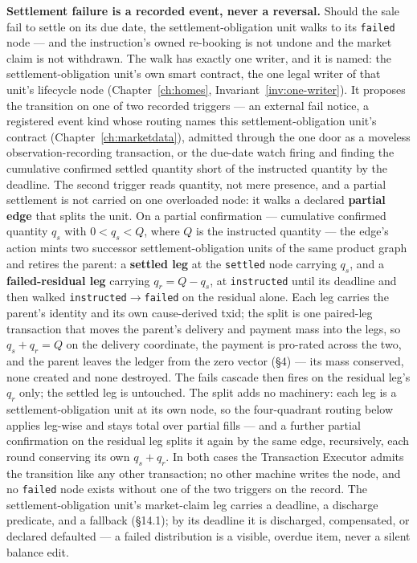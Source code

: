 \documentclass[11pt,a4paper]{article}
\begin{document}
\medskip\noindent\textbf{Settlement failure is a recorded event, never a reversal.}
Should the sale fail to settle on its due date, the settlement-obligation unit walks
to its \texttt{failed} node --- and the instruction's owned re-booking is not undone
and the market claim is not withdrawn. The walk has exactly one writer, and it is
named: the settlement-obligation unit's own smart contract, the one legal writer of
that unit's lifecycle node (Chapter~\ref{ch:homes}, Invariant~\ref{inv:one-writer}).
It proposes the transition on one of two recorded triggers --- an external fail
notice, a registered event kind whose routing names this settlement-obligation unit's
contract (Chapter~\ref{ch:marketdata}), admitted through the one door as a moveless
observation-recording transaction, or the due-date watch firing and finding the cumulative
confirmed settled quantity short of the instructed quantity by the deadline. The
second trigger reads quantity, not mere presence, and a partial settlement is not
carried on one overloaded node: it walks a declared \textbf{partial edge} that splits
the unit. On a partial confirmation --- cumulative confirmed quantity $q_s$ with
$0 < q_s < Q$, where $Q$ is the instructed quantity --- the edge's action mints two
successor settlement-obligation units of the same product graph and retires the parent:
a \textbf{settled leg} at the \texttt{settled} node carrying $q_s$, and a
\textbf{failed-residual leg} carrying $q_r = Q - q_s$, at \texttt{instructed} until its
deadline and then walked \texttt{instructed}$\to$\texttt{failed} on the residual alone.
Each leg carries the parent's identity and its own cause-derived txid; the split is one
paired-leg transaction that moves the parent's delivery and payment mass into the legs,
so $q_s + q_r = Q$ on the delivery coordinate, the payment is pro-rated across the two,
and the parent leaves the ledger from the zero vector (\S4) --- its mass conserved, none
created and none destroyed. The fails cascade then fires on the residual leg's $q_r$
only; the settled leg is untouched. The split adds no machinery: each leg is a
settlement-obligation unit at its own node, so the four-quadrant routing below applies
leg-wise and stays total over partial fills --- and a further partial confirmation on the
residual leg splits it again by the same edge, recursively, each round conserving its own
$q_s + q_r$. In both cases the Transaction Executor admits the
transition like any other transaction; no other machine writes the node, and no
\texttt{failed} node exists without one of the two triggers on the record. The settlement-obligation unit's market-claim leg carries
a deadline, a discharge predicate, and a fallback (\S14.1); by its deadline it is
discharged, compensated, or declared defaulted --- a failed distribution is a
visible, overdue item, never a silent balance edit.
\end{document}

